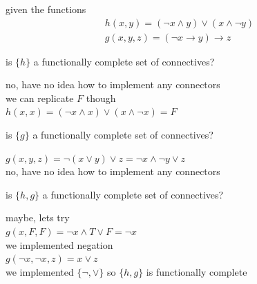 \documentclass[a4paper,12pt]{article}
\begin{document}
\begin{question}
given the functions\\
\begin{gather*}
  h(x,y) = (\lnot x \land y) \lor (x \land \lnot y)\\
  g(x,y,z) = (\lnot x \to y) \to z
\end{gather*}
\begin{subquestion}
is \(\{h\}\) a functionally complete set of connectives?\\
\begin{answer}
no, have no idea how to implement any connectors\\
we can replicate \(F\) though\\
\(h(x,x)=(\lnot x \land x) \lor (x \land \lnot x)=F\)\\
\end{answer}
\end{subquestion}
\begin{subquestion}
is \(\{g\}\) a functionally complete set of connectives?\\
\begin{answer}
\(g(x,y,z) = \lnot (x \lor y) \lor z = \lnot x \land \lnot y \lor z\)\\
no, have no idea how to implement any connectors\\
\end{answer}
\end{subquestion}
\begin{subquestion}
is \(\{h,g\}\) a functionally complete set of connectives?\\
\begin{answer}
maybe, lets try\\
\(g(x,F,F) = \lnot x \land T \lor F = \lnot x\)\\
we implemented negation\\
\(g(\lnot x, \lnot x, z) = x \lor z\)\\
we implemented \(\{\lnot, \lor\}\) so \(\{h,g\}\) is functionally complete\\
\end{answer}
\end{subquestion}
\end{question}
\end{document}
